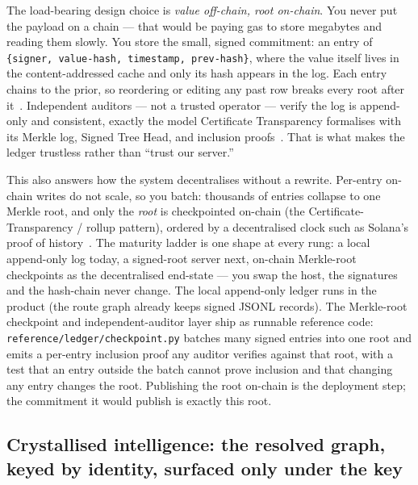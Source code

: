 \documentclass[11pt]{article}
\begin{document}
The load-bearing design choice is \emph{value off-chain, root on-chain}. You never
put the payload on a chain --- that would be paying gas to store megabytes and
reading them slowly. You store the small, signed commitment: an entry of
\texttt{\{signer, value-hash, timestamp, prev-hash\}}, where the value itself lives
in the content-addressed cache and only its hash appears in the log. Each entry
chains to the prior, so reordering or editing any past row breaks every root after
it~\cite{bitcoin}. Independent auditors --- not a trusted operator --- verify the
log is append-only and consistent, exactly the model Certificate Transparency
formalises with its Merkle log, Signed Tree Head, and inclusion
proofs~\cite{rfc6962}. That is what makes the ledger trustless rather than
``trust our server.''

This also answers how the system decentralises without a rewrite. Per-entry
on-chain writes do not scale, so you batch: thousands of entries collapse to one
Merkle root, and only the \emph{root} is checkpointed on-chain (the
Certificate-Transparency / rollup pattern), ordered by a decentralised clock such
as Solana's proof of history~\cite{solana}. The maturity ladder is one shape at
every rung: a local append-only log today, a signed-root server next, on-chain
Merkle-root checkpoints as the decentralised end-state --- you swap the host, the
signatures and the hash-chain never change. The local append-only
ledger runs in the product (the route graph already keeps signed JSONL records). The
Merkle-root checkpoint and independent-auditor layer ship as runnable reference code:
\texttt{reference/ledger/checkpoint.py} batches many signed entries into one root
and emits a per-entry inclusion proof any auditor verifies against that root, with a
test that an entry outside the batch cannot prove inclusion and that changing any
entry changes the root. Publishing the root on-chain is the deployment step; the
commitment it would publish is exactly this root.

\subsection{Crystallised intelligence: the resolved graph, keyed by identity, surfaced only under the key}
\end{document}
